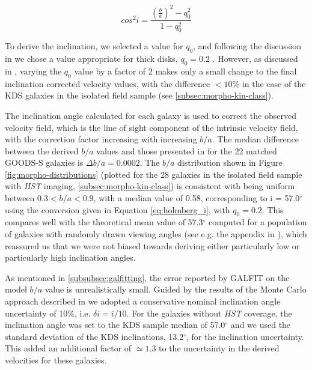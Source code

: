 \documentclass[fleqn,usenatbib]{mnras}
\begin{document}
\begin{equation}\label{eq:holmberg_i}
   cos^{2}i = \frac{\left(\frac{b}{a}\right)^{2} - q_{0}^{2}}{1 - q_{0}^{2}}
\end{equation}


To derive the inclination, we selected a value for $q_{0}$, and following the discussion in \citep{Law2012a} we chose a value appropriate for thick disks, $q_{0} = 0.2$ \citep[e.g.][]{Epinat2012,Harrison2017}.
However, as discussed in \cite{Harrison2017}, varying the $q_{0}$ value by a factor of 2 makes only a small change to the final inclination corrected velocity values, with the difference $<10\%$ in the case of the KDS galaxies in the isolated field sample (see \cref{subsec:morpho-kin-class}).

The inclination angle calculated for each galaxy is used to correct the observed velocity field, which is the line of sight component of the intrinsic velocity field, with the correction factor increasing with increasing $b/a$.
The median difference between the derived $b/a$ values and those presented in \cite{VanderWel2012} for the 22 matched GOODS-S galaxies is $\Delta b/a = 0.0002$.
The $b/a$ distribution shown in Figure \ref{fig:morpho-distributions} (plotted for the 28 galaxies in the isolated field sample with {\em HST} imaging, \cref{subsec:morpho-kin-class}) is consistent with being uniform between $0.3 < b/a < 0.9$, with a median value of 0.58, corresponding to i = 57.0$^{\circ}$ using the conversion given in Equation \ref{eq:holmberg_i}, with $q_{0}=0.2$.
This compares well with the theoretical mean value of 57.3$^{\circ}$ computed for a population of galaxies with randomly drawn viewing angles (see e.g. the appendix in \citealt{Law2009}), which reassured us that we were not biased towards deriving either particularly low or particularly high inclination angles.

As mentioned in \cref{subsubsec:galfitting}, the error reported by {\scriptsize GALFIT} on the model $b/a$ value is unrealistically small.
Guided by the results of the Monte Carlo approach described in \cite{Epinat2012} we adopted a conservative nominal inclination angle uncertainty of 10$\%$, i.e. $\delta i = i / 10$.
For the galaxies without {\em HST} coverage, the inclination angle was set to the KDS sample median of 57.0$^{\circ}$ and we used the standard deviation of the KDS inclinations, 13.2$^{\circ}$, for the inclination uncertainty.
This added an additional factor of $\simeq1.3$ to the uncertainty in the derived velocities for these galaxies.
\end{document}
